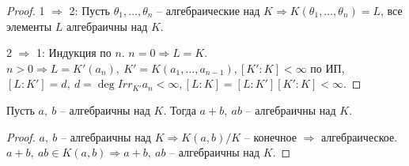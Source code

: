 \documentclass[main]{subfiles}
\begin{document}
\begin{proof}
    1 $\Rightarrow$ 2: Пусть $\theta_1, \ldots, \theta_n$ -- алгебраические над $K \Rightarrow
    K(\theta_1, \ldots, \theta_n) = L$, все элементы $L$ алгебраичны над $K$.

    2 $\Rightarrow$ 1: Индукция по $n$. $n = 0 \Rightarrow L = K$.
    $n > 0 \Rightarrow L = K'(a_n), \ K' = K(a_1, \ldots, a_{n-1}),
    [K':K] < \infty$ по ИП, $[L:K'] = d, \ d = \deg Irr_{K'}a_n < \infty, 
    [L:K] = [L:K'][K':K] < \infty$.
\end{proof}

\begin{corollary}
    Пусть $a, \ b$  -- алгебраичны над $K$. Тогда $a + b, \ ab$ -- алгебраичны над $K$. 
\end{corollary}
    
\begin{proof}
    $a, \ b$  -- алгебраичны над $K \Rightarrow K(a, b)/K$ -- конечное $\Rightarrow$ алгебраическое.
    $a+b, \ ab \in K(a, b) \Rightarrow a+b, \ ab$ -- алгебраичны над $K$.
\end{proof}
\end{document}

